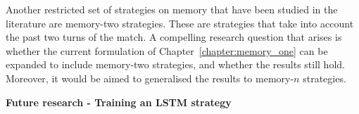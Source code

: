 Another restricted set of strategies on memory that have been studied in the literature
are memory-two strategies. These are strategies that take into account the past
two turns of the match. A compelling research question that arises is whether
the current formulation of Chapter~\ref{chapter:memory_one} can be expanded to
include memory-two strategies, and whether the results still hold. Moreover,
it would be aimed to generalised the results to memory-\(n\) strategies.

\textbf{Future research - Training an LSTM strategy}

